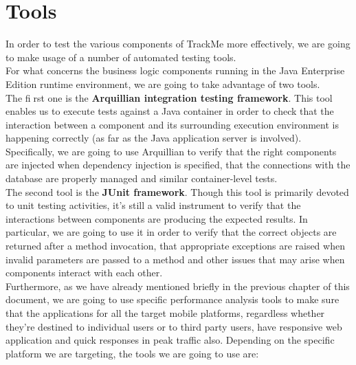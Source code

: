 \documentclass[a4paper, hidelinks, 12pt]{report}
\begin{document}
	\section{Tools}
	In order to test the various components of TrackMe more effectively, we are going to make usage of a number of automated testing tools.\\
	
	For what concerns the business logic components running in the Java Enterprise Edition runtime environment, we are going to take advantage of two tools.\\
	
	The first one is the \textbf{Arquillian integration testing framework}. This tool enables us to execute tests against a Java container in order to check that the interaction between a component and its surrounding execution environment is happening correctly (as far as the Java application server is involved). Specifically, we are going to use Arquillian to verify that the right components are injected when dependency injection is specified, that the connections with the database are properly managed and similar container-level tests.\\
	
	The second tool is the \textbf{JUnit framework}. Though this tool is primarily devoted to unit testing activities, it's still a valid instrument to verify that the interactions between components are producing the expected results. In particular, we are going to use it in order to verify that the correct objects are returned after a method invocation, that appropriate exceptions are raised when invalid parameters are passed to a method and other issues that may arise when components interact with each other.\\
	
	Furthermore, as we have already mentioned briefly in the previous chapter of this document, we are going to use specific performance analysis tools to make sure that the applications for all the target mobile platforms, regardless whether they're destined to individual users or to third party users, have responsive web application and quick responses in peak traffic also. Depending on the specific platform we are targeting, the tools we are going to use are:
	
\end{document}
